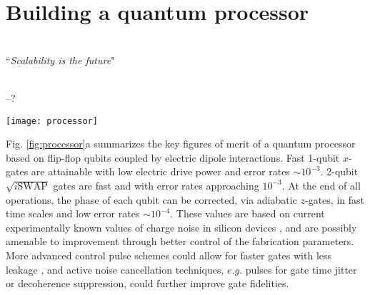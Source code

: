 
\chapter{Building a quantum processor} %

\label{Chapter4} %

\HRule
\vspace{0.5cm} \hspace{2cm}
\small
\hangindent=4cm
\\
        ``\emph{Scalability is the future}"
\\ \\
\hangindent=4cm
\begin{flushright}
--? \\
\end{flushright}

\vspace{0.5cm}

\noindent \HRule
\clearpage

\begin{figure*}
	\centering
	\texttt{[image: processor]}
	\caption{\textbf{Silicon hybrid quantum processor}.
		\textbf{a} Schematic view of a large-scale quantum processor based upon $^{31}$P donors in Si, operated and coupled through the use of an induced electric dipole. Idle qubits have electrons at the interface, leaving the $^{31}$P nucleus in the ultra-coherent ionized state.  Electrons are partially shifted towards the donor for quantum operations. The sketch shows a possible architecture where a cluster of qubits is locally coupled via the electric dipole, and a subgroup thereof is further coupled to another cluster through interaction with a shared microwave cavity (aqua). The drawing is not to scale; control lines and readout devices are not shown.}
	\label{fig:processor}
\end{figure*}

Fig. \ref{fig:processor}a summarizes the key figures of merit of a quantum processor based on flip-flop qubits coupled by electric dipole interactions. Fast 1-qubit $x$-gates are attainable with low electric drive power and error rates $\sim10^{-3}$. 2-qubit $\sqrt{i\mathrm{SWAP}}$ gates are fast and with error rates approaching $10^{-3}$. At the end of all operations, the phase of each qubit can be corrected, via adiabatic $z$-gates, in fast time scales and low error rates $\sim10^{-4}$. These values are based on current experimentally known values of charge noise in silicon devices \cite{Freeman2016}, and are possibly amenable to improvement through better control of the fabrication parameters. More advanced control pulse schemes could allow for faster gates with less leakage \cite{Motzoi2009,Ghosh2016,Werschnik2007}, and active noise cancellation techniques, $e.g.$ pulses for gate time jitter \cite{Hill2007} or decoherence \cite{Sar2012} suppression, could further improve gate fidelities. 


